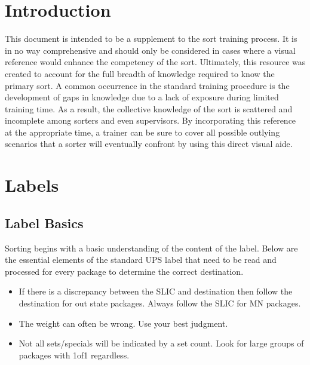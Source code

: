 \documentclass[12pt]{article}
\begin{document}
\maketitle{\vspace{-2cm}}
\tableofcontents

\section{Introduction}
This document is intended to be a supplement to the sort training process. It is in no way comprehensive and should only be considered in cases where a visual reference would enhance the competency of the sort. Ultimately, this resource was created to account for the full breadth of knowledge required to know the primary sort. A common occurrence in the standard training procedure is the development of gaps in knowledge due to a lack of exposure during limited training time. As a result, the collective knowledge of the sort is scattered and incomplete among sorters and even supervisors. By incorporating this reference at the appropriate time, a trainer can be sure to cover all possible outlying scenarios that a sorter will eventually confront by using this direct visual aide.

\clearpage


\section{Labels}

\subsection{Label Basics}
Sorting begins with a basic understanding of the content of the label. Below are the essential elements of the standard UPS label that need to be read and processed for every package to determine the correct destination. 

\begin{itemize}
    \item If there is a discrepancy between the SLIC and destination then follow the destination for out state packages. Always follow the SLIC for MN packages.
    \item The weight can often be wrong. Use your best judgment. 
    \item Not all sets/specials will be indicated by a set count. Look for large groups of packages with 1of1 regardless.
\end{itemize}
\end{document}
